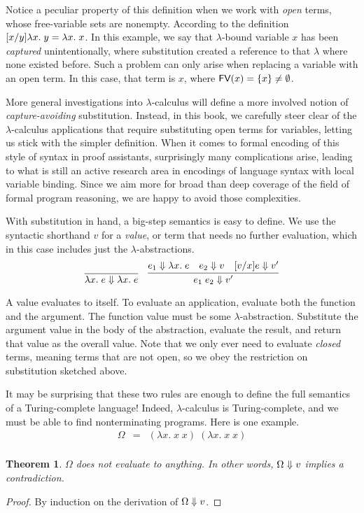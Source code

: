 \documentclass{amsbook}
\newtheorem{theorem}{Theorem}[chapter]
\theoremstyle{definition}
\theoremstyle{remark}
\numberwithin{section}{chapter}
\numberwithin{equation}{chapter}
\begin{document}
Notice a peculiar property of this definition when we work with \emph{open} terms, whose free-variable sets are nonempty.
According to the definition $\subst{\lambda x. \; y}{y}{x} = \lambda x. \; x$.
In this example, we say that $\lambda$-bound variable $x$ has been \emph{captured} unintentionally, where substitution created a reference to that $\lambda$ where none existed before.
Such a problem can only arise when replacing a variable with an open term.
In this case, that term is $x$, where $\fv{x} = \{x\} \neq \emptyset$.

More general investigations into $\lambda$-calculus will define a more involved notion of \emph{capture-avoiding} substitution.
Instead, in this book, we carefully steer clear of the $\lambda$-calculus applications that require substituting open terms for variables, letting us stick with the simpler definition.
When it comes to formal encoding of this style of syntax in proof assistants, surprisingly many complications arise, leading to what is still an active research area in encodings of language syntax with local variable binding.
Since we aim more for broad than deep coverage of the field of formal program reasoning, we are happy to avoid those complexities.

With substitution in hand, a big-step semantics is easy to define.
We use the syntactic shorthand $v$ for a \emph{value}, or term that needs no further evaluation, which in this case includes just the $\lambda$-abstractions.
\encoding
$$\infer{\bigstep{\lambda x. \; e}{\lambda x. \; e}}{}
\quad \infer{\bigstep{e_1 \; e_2}{v'}}{
  \bigstep{e_1}{\lambda x. \; e}
  & \bigstep{e_2}{v}
  & \bigstep{\subst{e}{x}{v}}{v'}
}$$

A value evaluates to itself.
To evaluate an application, evaluate both the function and the argument.
The function value must be some $\lambda$-abstraction.
Substitute the argument value in the body of the abstraction, evaluate the result, and return that value as the overall value.
Note that we only ever need to evaluate \emph{closed} terms, meaning terms that are not open, so we obey the restriction on substitution sketched above.

It may be surprising that these two rules are enough to define the full semantics of a Turing-complete language!
Indeed, $\lambda$-calculus is Turing-complete, and we must be able to find nonterminating programs.
Here is one example.
\begin{eqnarray*}
  \Omega &=& (\lambda x. \; x \; x) \; (\lambda x. \; x \; x) \\
\end{eqnarray*}
\begin{theorem}
  $\Omega$ does not evaluate to anything.  In other words, $\bigstep{\Omega}{v}$ implies a contradiction.
\end{theorem}
\begin{proof}
  By induction on the derivation of $\bigstep{\Omega}{v}$.
\end{proof}
\end{document}
